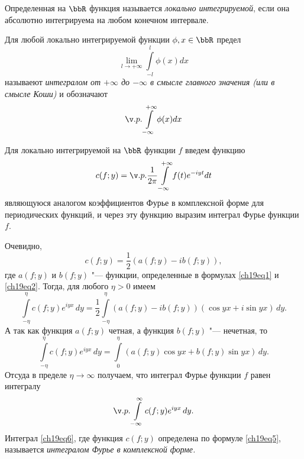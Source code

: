 \begin{defn}
Определенная на $\bbR$ функция называется \textit{локально интегрируемой}, если она абсолютно интегрируема на любом конечном интервале.
\end{defn}
\begin{defn}
Для любой локально интегрируемой функции $\phi, x \in \bbR$ предел
$$
\lim_{l \to +\infty}\int\limits_{-l}^{l} \phi(x)dx
$$
называеют \textit{интегралом от $+\infty$ до $-\infty$ в смысле главного значения (или в смысле Коши)} и обозначают
$$
\v.p.\int\limits_{-\infty}^{+\infty} \phi(x)dx
$$
\end{defn}

Для локально интегрируемой на $\bbR$ функции $f$ введем функцию
\begin{equation} \label{ch19eq5}
c(f;y)=\v.p.\frac{1}{2\pi}\int\limits_{-\infty}^{+\infty} f(t)e^{-iyt}dt
\end{equation}
являющуюся аналогом коэффициентов Фурье в комплексной форме для периодических функций, и через эту функцию выразим интеграл Фурье функции $f$.

Очевидно,
$$
c(f;y) = \frac12 (a(f;y) - ib(f;y)),
$$
где $a(f;y)$ и $b(f;y)$ "--- функции, определенные в формулах \eqref{ch19eq1} и \eqref{ch19eq2}. Тогда, для любого $\eta > 0$ имеем
$$
\int\limits_{-\eta}^{\eta} c(f;y)e^{iyx}\,dy = \frac12 \int\limits_{-\eta}^{\eta} (a(f;y) - ib(f;y))(\cos yx + i\sin yx)\,dy.
$$
А так как функция $a(f;y)$ четная, а функция $b(f;y)$ "--- нечетная, то
$$
\int\limits_{-\eta}^{\eta} c(f;y)e^{iyx}\,dy = \int\limits_{0}^{\eta}(a(f;y)\cos yx + b(f;y)\sin yx)\,dy.
$$
Отсуда в пределе $\eta \to \infty$ получаем, что интеграл Фурье функции $f$ равен интегралу
\begin{equation} \label{ch19eq6}
\v.p. \int\limits_{-\infty}^{\infty} c(f;y)e^{iyx}\,dy.
\end{equation}
Интеграл \eqref{ch19eq6}, где функция $c(f;y)$ определена по формуле \eqref{ch19eq5}, называется \textit{интегралом Фурье в комплексной форме.}

